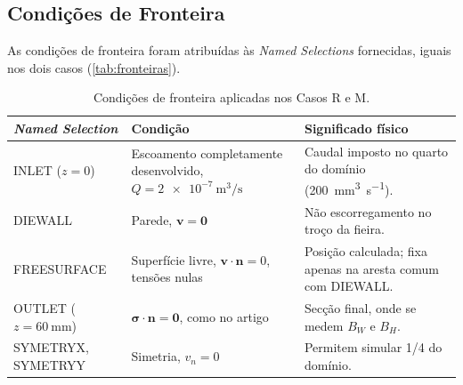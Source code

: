 \subsection{Condições de Fronteira}
\label{subsec:fronteiras}

As condições de fronteira foram atribuídas às \textit{Named Selections} fornecidas, iguais nos dois casos (\autoref{tab:fronteiras}).

\begin{table}[H]
    \centering
    \footnotesize
    \setlength{\tabcolsep}{4pt}
    \caption{Condições de fronteira aplicadas nos Casos R e M.}
    \label{tab:fronteiras}
    \begin{tabularx}{\textwidth}{>{\raggedright\arraybackslash}p{2.8cm} >{\raggedright\arraybackslash}p{4.2cm} X}
        \toprule
        \textit{Named Selection} & Condição & Significado físico \\
        \midrule
        INLET ($z = 0$) & Escoamento completamente desenvolvido, $Q = \qty{2e-7}{\metre\cubed\per\second}$ & Caudal imposto no quarto do domínio (\qty{200}{\milli\metre\cubed\per\second}). \\
        DIEWALL & Parede, $\mathbf{v} = \mathbf{0}$ & Não escorregamento no troço da fieira. \\
        FREESURFACE & Superfície livre, $\mathbf{v}\cdot\mathbf{n} = 0$, tensões nulas & Posição calculada; fixa apenas na aresta comum com DIEWALL. \\
        OUTLET ($z = \qty{60}{\milli\metre}$) & $\boldsymbol{\sigma}\cdot\mathbf{n} = \mathbf{0}$, como no artigo~\cite{Zhang2026Anisotropic}
        & Secção final, onde se medem $B_W$ e $B_H$. \\
        SYMETRYX, SYMETRYY & Simetria, $v_n = 0$ & Permitem simular 1/4 do domínio. \\
        \bottomrule
    \end{tabularx}
\end{table}


